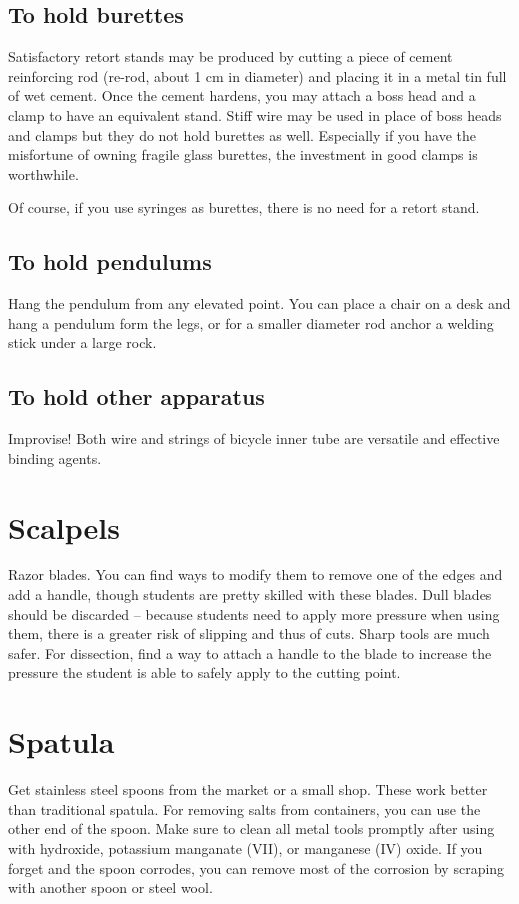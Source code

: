 \subsection{To hold burettes}
Satisfactory retort stands may be produced 
by cutting a piece of cement reinforcing rod (re-rod, 
about 1 cm in diameter) and placing it in a metal tin full of wet cement. 
Once the cement hardens, 
you may attach a boss head and a clamp to have an equivalent stand. 
Stiff wire may be used in place of boss heads and clamps 
but they do not hold burettes as well. 
Especially if you have the misfortune of owning fragile glass burettes, 
the investment in good clamps is worthwhile.

Of course, 
if you use syringes as burettes, 
there is no need for a retort stand.

\subsection{To hold pendulums}
Hang the pendulum from any elevated point. 
You can place a chair on a desk and hang a pendulum form the legs, 
or for a smaller diameter rod anchor a welding stick under a large rock.

\subsection{To hold other apparatus}
Improvise! 
Both wire and strings of bicycle inner tube are versatile 
and effective binding agents.

\section{Scalpels}
Razor blades. 
You can find ways to modify them 
to remove one of the edges and add a handle, 
though students are pretty skilled with these blades. 
Dull blades should be discarded – 
because students need to apply more pressure when using them, 
there is a greater risk of slipping and thus of cuts. 
Sharp tools are much safer. 
For dissection, 
find a way to attach a handle to the blade 
to increase the pressure 
the student is able to safely apply to the cutting point.

\section{Spatula}
Get stainless steel spoons from the market or a small shop. 
These work better than traditional spatula. 
For removing salts from containers, 
you can use the other end of the spoon. 
Make sure to clean all metal tools promptly after using with hydroxide, 
potassium manganate (VII), 
or manganese (IV) oxide. 
If you forget and the spoon corrodes, 
you can remove most of the corrosion 
by scraping with another spoon or steel wool.

